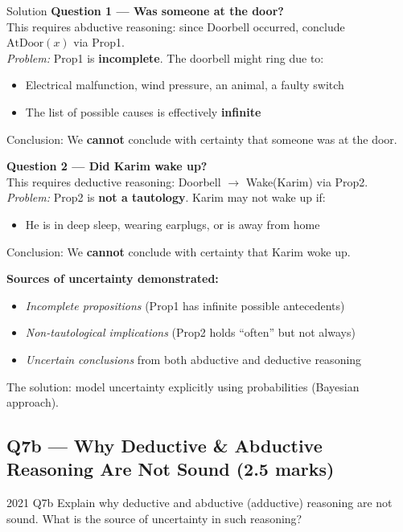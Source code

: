 \documentclass[12pt,a4paper]{article}
\begin{document}
\begin{solbox}{Solution}
\textbf{Question 1 --- Was someone at the door?}\\
This requires abductive reasoning: since Doorbell occurred, conclude $\text{AtDoor}(x)$ via Prop1.\\
\textit{Problem:} Prop1 is \textbf{incomplete}. The doorbell might ring due to:
\begin{itemize}[noitemsep,topsep=2pt]
  \item Electrical malfunction, wind pressure, an animal, a faulty switch
  \item The list of possible causes is effectively \textbf{infinite}
\end{itemize}
Conclusion: We \textbf{cannot} conclude with certainty that someone was at the door.

\medskip
\textbf{Question 2 --- Did Karim wake up?}\\
This requires deductive reasoning: Doorbell $\to$ Wake(Karim) via Prop2.\\
\textit{Problem:} Prop2 is \textbf{not a tautology}. Karim may not wake up if:
\begin{itemize}[noitemsep,topsep=2pt]
  \item He is in deep sleep, wearing earplugs, or is away from home
\end{itemize}
Conclusion: We \textbf{cannot} conclude with certainty that Karim woke up.

\medskip
\textbf{Sources of uncertainty demonstrated:}
\begin{itemize}[noitemsep]
  \item \textit{Incomplete propositions} (Prop1 has infinite possible antecedents)
  \item \textit{Non-tautological implications} (Prop2 holds ``often'' but not always)
  \item \textit{Uncertain conclusions} from both abductive and deductive reasoning
\end{itemize}
The solution: model uncertainty explicitly using probabilities (Bayesian approach).
\end{solbox}

\subsection{Q7b --- Why Deductive \& Abductive Reasoning Are Not Sound (2.5 marks)}

\begin{qbox}{2021 Q7b}
Explain why deductive and abductive (adductive) reasoning are not sound. What is the source of uncertainty in such reasoning?
\end{qbox}
\end{document}
